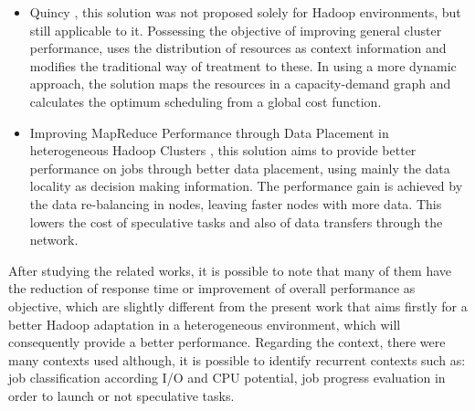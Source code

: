 \begin{itemize}
	\item Quincy \cite{Quincy}, this solution was not proposed solely for Hadoop environments, but still applicable to it. Possessing the objective of improving general cluster performance, uses the distribution of resources as context information and modifies the traditional way of treatment to these. In using a more dynamic approach, the solution maps the resources in a capacity-demand graph and calculates the optimum scheduling from a global cost function.

	\item Improving MapReduce Performance through Data Placement in heterogeneous Hadoop Clusters \cite{IMRPDPHHC}, this 	solution aims to provide better performance on jobs through better data placement, using mainly the data locality as decision making information. The performance gain is achieved by the data re-balancing in nodes, leaving faster nodes with more data. This lowers the cost of speculative tasks and also of data transfers through the network.
\end{itemize}

After studying the related works, it is possible to note that many of them have the reduction of response time or improvement of overall performance as objective, which are slightly different from the present work that aims firstly for a better Hadoop adaptation in a heterogeneous environment, which will consequently provide a better performance.
Regarding the context, there were many contexts used although, it is possible to identify recurrent contexts such as: job classification according I/O and CPU potential, job progress evaluation in order to launch or not speculative tasks.